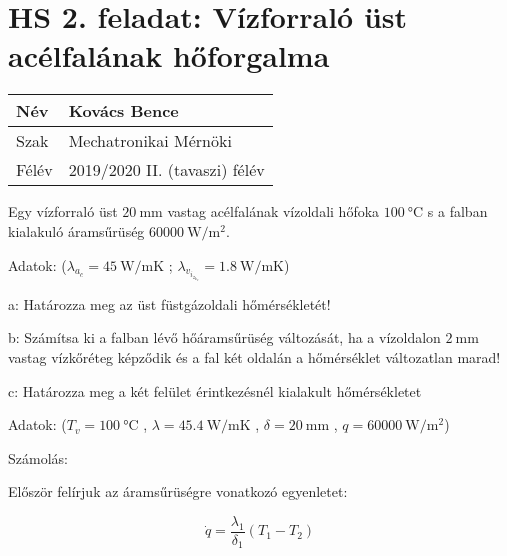 
\section*{HS 2. feladat: Vízforraló üst acélfalának hőforgalma}

\begin{tabular}{ | p{2cm} | p{14cm} | } 
	\hline
	Név & Kovács Bence \\ 
	\hline
	Szak &  Mechatronikai Mérnöki\\
	\hline
	Félév & 2019/2020 II. (tavaszi) félév \\ 
	\hline
\end{tabular}
\vspace{0.5cm}


Egy vízforraló üst $\SI{20}{\milli\meter}$ vastag acélfalának vízoldali hőfoka $\SI{100}{\celsius}$ s a falban kialakuló áramsűrüség $\SI{60000}{\watt\per\meter^2}$.

\noindent Adatok:    ($\lambda_a_c = \SI{45}{\watt\per\meter\kelvin}$ ;
                     $\lambda_v_i_z_k_o = \SI{1,8}{\watt\per\meter\kelvin}$)
                     
\vspace{1mm}

\vspace{1mm}
\noindent a: Határozza meg az üst füstgázoldali hőmérsékletét!

\vspace{1mm}
\noindent b: Számítsa ki a falban lévő hőáramsűrüség változását, ha a vízoldalon $\SI{2}{\milli\meter}$ vastag vízkőréteg képződik és a fal két oldalán a hőmérséklet változatlan marad!

\vspace{1mm}
\noindent c: Határozza meg a két felület érintkezésnél kialakult hőmérsékletet
\vspace{1mm}

Adatok:
($ T_v = \SI{100}{\celsius} $ , $\lambda = \SI{45.4}{\watt\per\meter\kelvin}$ , $\delta = \SI{20}{\milli\meter}$ ,  $ q = \SI{60000}{\watt\per\meter^2} $)

\vspace{2mm}

Számolás:


Először felírjuk az áramsűrüségre vonatkozó egyenletet:

\begin{equation}
	 \dot{q} = \frac{\lambda_1}{\delta_1} (T_1 - T_2)
\end{equation}


